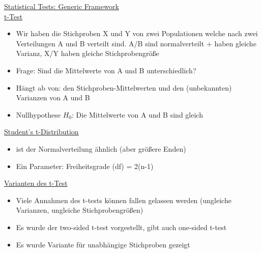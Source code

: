 \documentclass[a4paper,10pt,oneside]{article}
\begin{document}
\underline{Statistical Tests: Generic Framework} \\
 
\underline{t-Test} \\
 	\begin{itemize}
 		\item Wir haben die Stichproben X und Y von zwei Populationen welche nach zwei Verteilungen A und B verteilt sind. A/B sind normalverteilt + haben gleiche Varianz, X/Y haben gleiche Stichprobengröße
 		\item Frage: Sind die Mittelwerte von A und B unterschiedlich?
 		\item Hängt ab von: den Stichproben-Mittelwerten und den (unbekannten) Varianzen von A und B
 		\item Nullhypothese $H_0$: Die Mittelwerte von A und B sind gleich
 	\end{itemize}
 	
\underline{Student's t-Distribution} \\
 	\begin{itemize}
 		\item ist der Normalverteilung ähnlich (aber größere Enden)
 		\item Ein Parameter: Freiheitsgrade (df) = 2(n-1)
 	\end{itemize}
 		
\underline{Varianten des t-Test} \\
 	\begin{itemize}
 		\item Viele Annahmen des t-tests können fallen gelassen werden (ungleiche Varianzen, ungleiche Stichprobengrößen)
 		\item Es wurde der two-sided t-test vorgestellt, gibt auch one-sided t-test
 		\item Es wurde Variante für unabhängige Stichproben gezeigt
 	\end{itemize}
 		
 		
 		
 		
 		
 		
 		
 		
 		
 		
 		
 		
 		
 		
 		
 	

 
\end{document}
